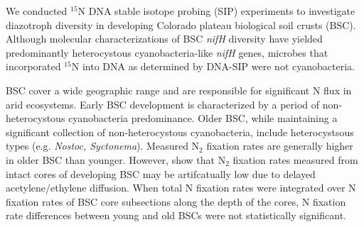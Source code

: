 We conducted $^{15}$N DNA stable isotope probing (SIP) experiments to investigate diazotroph diversity in developing Colorado plateau biological soil crusts (BSC). Although molecular characterizations of BSC \textit{nifH} diversity have yielded predominantly heterocystous cyanobacteria-like \textit{nifH} genes, microbes that incorporated $^{15}$N into DNA as determined by DNA-SIP were not cyanobacteria.

BSC cover a wide geographic range and are responsible for significant N flux in arid ecosystems. Early BSC development is characterized by a period of non-heterocystous cyanobacteria predominance. Older BSC, while maintaining a significant collection of non-heterocystous cyanobacteria, include heterocystsous types (e.g. \textit{Nostoc, Syctonema}). Measured N$_{2}$ fixation rates are generally higher in older BSC than younger. However, \citet{15643930} show that N$_{2}$ fixation rates measured from intact cores of developing BSC may be artifcatually low due to delayed acetylene/ethylene diffusion. When total N fixation rates were integrated over N fixation rates of BSC core subsections along the depth of the cores, N fixation rate differences between young and old BSCs were not statistically significant.


